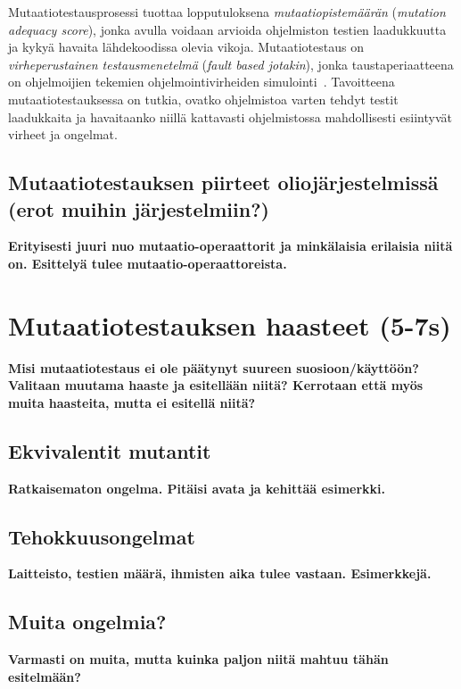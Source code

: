 \documentclass[finnish, grading]{tktltiki2}
\theoremstyle{definition}
\theoremstyle{remark}
\begin{document}
Mutaatiotestausprosessi tuottaa lopputuloksena \textit{mutaatiopistemäärän} (\textit{mutation adequacy score}), jonka avulla voidaan arvioida ohjelmiston testien laadukkuutta ja kykyä havaita lähdekoodissa olevia vikoja. Mutaatiotestaus on \textit{virheperustainen testausmenetelmä} (\textit{fault based jotakin}), jonka taustaperiaatteena on ohjelmoijien tekemien ohjelmointivirheiden simulointi~\cite[s. 649]{Jia:Harman:2011}. Tavoitteena mutaatiotestauksessa on tutkia, ovatko ohjelmistoa varten tehdyt testit laadukkaita ja havaitaanko niillä kattavasti ohjelmistossa mahdollisesti esiintyvät virheet ja ongelmat. 


\subsection{Mutaatiotestauksen piirteet oliojärjestelmissä (erot muihin järjestelmiin?)}

\textbf{Erityisesti juuri nuo mutaatio-operaattorit ja minkälaisia erilaisia niitä on. Esittelyä tulee mutaatio-operaattoreista.}

\section{Mutaatiotestauksen haasteet (5-7s)}

\textbf{Misi mutaatiotestaus ei ole päätynyt suureen suosioon/käyttöön? Valitaan muutama haaste ja esitellään niitä? Kerrotaan että myös muita haasteita, mutta ei esitellä niitä?}

\subsection{Ekvivalentit mutantit}

\textbf{Ratkaisematon ongelma. Pitäisi avata ja kehittää esimerkki.}

\subsection{Tehokkuusongelmat}

\textbf{Laitteisto, testien määrä, ihmisten aika tulee vastaan. Esimerkkejä.}

\subsection{Muita ongelmia?}

\textbf{Varmasti on muita, mutta kuinka paljon niitä mahtuu tähän esitelmään?}
\end{document}
